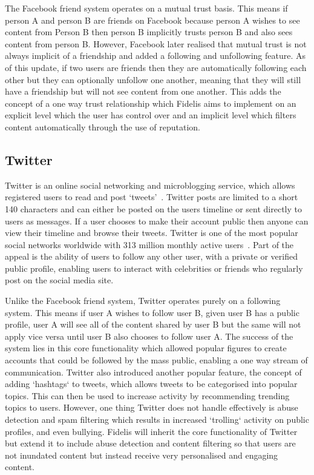The Facebook friend system operates on a mutual trust basis. This means if person A and person B are friends on Facebook because person A wishes to see content from Person B then person B implicitly trusts person B and also sees content from person B. However, Facebook later realised that mutual trust is not always implicit of a friendship and added a following and unfollowing feature. As of this update, if two users are friends then they are automatically following each other but they can optionally unfollow one another, meaning that they will still have a friendship but will not see content from one another. This adds the concept of a one way trust relationship which Fidelis aims to implement on an explicit level which the user has control over and an implicit level which filters content automatically through the use of reputation.

\subsection{Twitter}
Twitter is an online social networking and microblogging service, which allows registered users to read and post `tweets'~\cite{Statista:Twitter}. Twitter posts are limited to a short 140 characters and can either be posted on the users timeline or sent directly to users as messages. If a user chooses to make their account public then anyone can view their timeline and browse their tweets. Twitter is one of the most popular social networks worldwide with 313 million monthly active users~\cite{Statista:Twitter, Twitter:About}. Part of the appeal is the ability of users to follow any other user, with a private or verified public profile, enabling users to interact with celebrities or friends who regularly post on the social media site.

Unlike the Facebook friend system, Twitter operates purely on a following system. This means if user A wishes to follow user B, given user B has a public profile, user A will see all of the content shared by user B but the same will not apply vice versa until user B also chooses to follow user A. The success of the system lies in this core functionality which allowed popular figures to create accounts that could be followed by the mass public, enabling a one way stream of communication. Twitter also introduced another popular feature, the concept of adding `hashtags` to tweets, which allows tweets to be categorised into popular topics. This can then be used to increase activity by recommending trending topics to users. However, one thing Twitter does not handle effectively is abuse detection and spam filtering which results in increased `trolling` activity on public profiles, and even bullying. Fidelis will inherit the core functionality of Twitter but extend it to include abuse detection and content filtering so that users are not inundated content but instead receive very personalised and engaging content.

